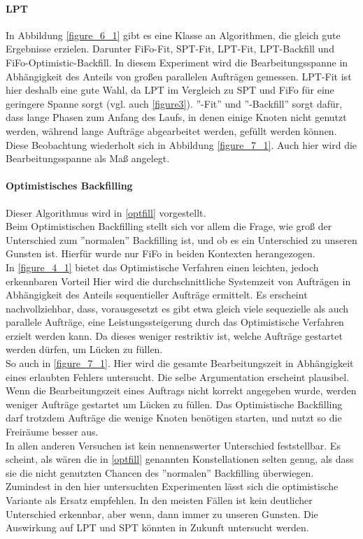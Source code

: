 \paragraph{LPT}
In Abbildung \ref{figure_6_1} gibt es eine Klasse an Algorithmen, die gleich gute Ergebnisse erzielen. Darunter FiFo-Fit, SPT-Fit, LPT-Fit, LPT-Backfill und FiFo-Optimistic-Backfill. In diesem Experiment wird die Bearbeitungsspanne in Abhängigkeit des Anteils von großen parallelen Aufträgen gemessen. LPT-Fit ist hier deshalb eine gute Wahl, da LPT im Vergleich zu SPT und FiFo für eine geringere Spanne sorgt (vgl. auch \ref{figure3}). ''-Fit'' und ''-Backfill'' sorgt dafür, dass lange Phasen zum Anfang des Laufs, in denen einige Knoten nicht genutzt werden, während lange Aufträge abgearbeitet werden, gefüllt werden können.\\
Diese Beobachtung wiederholt sich in Abbildung \ref{figure_7_1}. Auch hier wird die Bearbeitungsspanne als Maß angelegt.\\


\paragraph{Optimistisches Backfilling}
Dieser Algorithmus wird in \ref{optfill} vorgestellt.\\
Beim Optimistischen Backfilling stellt sich vor allem die Frage, wie groß der Unterschied zum ''normalen'' Backfilling ist, und ob es ein Unterschied zu unseren Gunsten ist. Hierfür wurde nur FiFo in beiden Kontexten herangezogen.\\
In \ref{figure_4_1} bietet das Optimistische Verfahren einen leichten, jedoch erkennbaren Vorteil Hier wird die durchschnittliche Systemzeit von Aufträgen in Abhängigkeit des Anteils sequentieller Aufträge ermittelt. Es erscheint nachvollziehbar, dass, vorausgesetzt es gibt etwa gleich viele sequezielle als auch parallele Aufträge, eine Leistungssteigerung durch das Optimistische Verfahren erzielt werden kann. Da dieses weniger restriktiv ist, welche Aufträge gestartet werden dürfen, um Lücken zu füllen.\\
So auch in \ref{figure_7_1}. Hier wird die gesamte Bearbeitungszeit in Abhängigkeit eines erlaubten Fehlers untersucht. Die selbe Argumentation erscheint plausibel. Wenn die Bearbeitungszeit eines Auftrags nicht korrekt angegeben wurde, werden weniger Aufträge gestartet um Lücken zu füllen. Das Optimistische Backfilling darf trotzdem Aufträge die wenige Knoten benötigen starten, und nutzt so die Freiräume besser aus.\\
In allen anderen Versuchen ist kein nennenswerter Unterschied feststellbar. Es scheint, als wären die in \ref{optfill} genannten Konstellationen selten genug, als dass sie die nicht genutzten Chancen des ''normalen'' Backfilling überwiegen. Zumindest in den hier untersuchten Experimenten lässt sich die optimistische Variante als Ersatz empfehlen. In den meisten Fällen ist kein deutlicher Unterschied erkennbar, aber wenn, dann immer zu unseren Gunsten. Die Auswirkung auf LPT und SPT könnten in Zukunft untersucht werden. 


